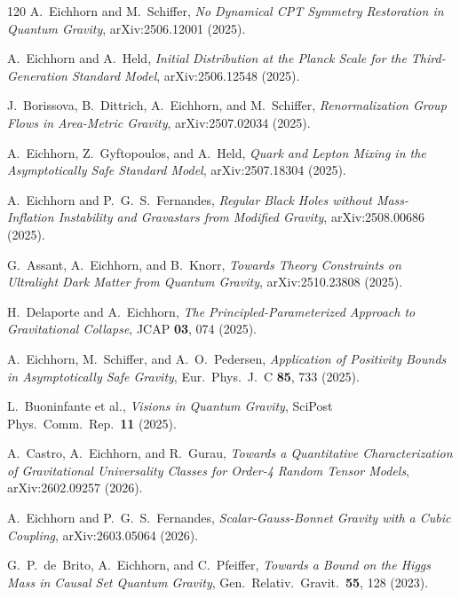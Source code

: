 \documentclass[12pt,a4paper]{article}
\begin{document}
\begin{thebibliography}{120}
A.~Eichhorn and M.~Schiffer,
\textit{No Dynamical CPT Symmetry Restoration in Quantum Gravity},
arXiv:2506.12001 (2025).

A.~Eichhorn and A.~Held,
\textit{Initial Distribution at the Planck Scale for the
Third-Generation Standard Model},
arXiv:2506.12548 (2025).

J.~Borissova, B.~Dittrich, A.~Eichhorn, and M.~Schiffer,
\textit{Renormalization Group Flows in Area-Metric Gravity},
arXiv:2507.02034 (2025).

A.~Eichhorn, Z.~Gyftopoulos, and A.~Held,
\textit{Quark and Lepton Mixing in the Asymptotically Safe Standard Model},
arXiv:2507.18304 (2025).

A.~Eichhorn and P.~G.~S.~Fernandes,
\textit{Regular Black Holes without Mass-Inflation Instability and
Gravastars from Modified Gravity},
arXiv:2508.00686 (2025).

G.~Assant, A.~Eichhorn, and B.~Knorr,
\textit{Towards Theory Constraints on Ultralight Dark Matter from
Quantum Gravity},
arXiv:2510.23808 (2025).

H.~Delaporte and A.~Eichhorn,
\textit{The Principled-Parameterized Approach to Gravitational Collapse},
JCAP \textbf{03}, 074 (2025).

A.~Eichhorn, M.~Schiffer, and A.~O.~Pedersen,
\textit{Application of Positivity Bounds in Asymptotically Safe Gravity},
Eur.\ Phys.\ J.\ C \textbf{85}, 733 (2025).

L.~Buoninfante et al.,
\textit{Visions in Quantum Gravity},
SciPost Phys.\ Comm.\ Rep.\ \textbf{11} (2025).

A.~Castro, A.~Eichhorn, and R.~Gurau,
\textit{Towards a Quantitative Characterization of Gravitational
Universality Classes for Order-4 Random Tensor Models},
arXiv:2602.09257 (2026).

A.~Eichhorn and P.~G.~S.~Fernandes,
\textit{Scalar-Gauss-Bonnet Gravity with a Cubic Coupling},
arXiv:2603.05064 (2026).

G.~P.~de~Brito, A.~Eichhorn, and C.~Pfeiffer,
\textit{Towards a Bound on the Higgs Mass in Causal Set Quantum Gravity},
Gen.\ Relativ.\ Gravit.\ \textbf{55}, 128 (2023).


\end{thebibliography}
\end{document}
